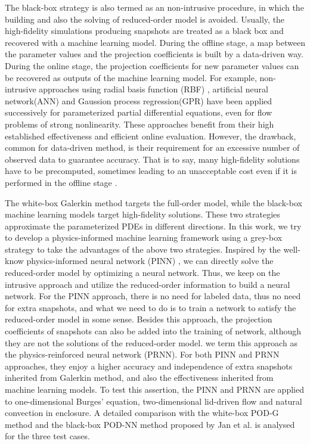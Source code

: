 \documentclass[preprint, 10pt]{elsarticle}
\begin{document}
The black-box strategy is also termed as an non-intrusive procedure, in which the building and also the solving of reduced-order model is avoided. Usually, the high-fidelity simulations producing snapshots are treated as a black box and recovered with a machine learning model.
During the offline stage, a map between the parameter values and the projection coefficients is built by a data-driven way. During the online stage, the projection coefficients for new parameter values can be recovered as outputs of the machine learning model.  For example, non-intrusive approaches using radial basis function (RBF) \cite{chen2018greedy, walton2013reduced, xiao2015non}, artificial neural network(ANN) \cite{hesthaven2018non} and Gaussion process regression(GPR) \cite{guo2019data} have been applied successively for parameterized partial differential equations, even for flow problems of strong nonlinearity. These approaches benefit from their high established effectiveness and efficient online evaluation. However, the drawback, common for data-driven method, is their requirement for an excessive number of observed data to guarantee accuracy. That is to say, many high-fidelity solutions have to be precomputed,  sometimes leading to an unacceptable cost even if it is performed in the offline stage \cite{hesthaven2018non}.


The white-box Galerkin method targets the full-order model, while the black-box machine learning models target high-fidelity solutions. These two strategies approximate the parameterized PDEs in different directions.
In this work,  we try to develop a physics-informed machine learning framework using a grey-box strategy to take the advantages of the above two strategies.
Inspired by the well-know physics-informed neural network (PINN) \cite{raissi2019physics, raissi2020hidden, mao2020physics}, we can directly solve the reduced-order model by  optimizing a neural network.
Thus, we keep on the intrusive approach and utilize the reduced-order information to build a neural network.
For the PINN approach, there is no need for labeled data, thus no need for extra snapshots, and what we need to do is to train a network to satisfy the reduced-order model in some sense.
Besides this approach,  the projection coefficients of snapshots can also be added into the training of network, although they are not the solutions of the reduced-order model. we term this approach as the physics-reinforced neural network (PRNN).
For both PINN and PRNN approaches, they enjoy a higher accuracy and independence of extra snapshots inherited from Galerkin method, and also the effectiveness inherited from machine learning models.
To test this assertion, the PINN and PRNN are applied to one-dimensional Burges' equation, two-dimensional lid-driven flow and natural convection in enclosure. A detailed comparison with the white-box POD-G method and the black-box POD-NN method proposed by Jan et al.\cite{hesthaven2018non} is analysed for the three test cases.
\end{document}
